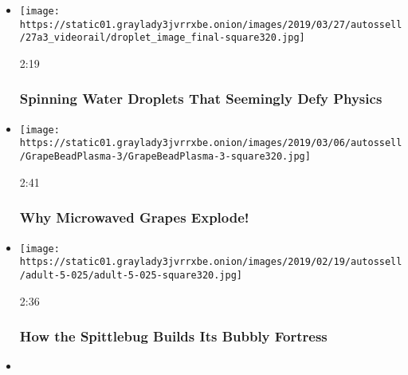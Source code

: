 \begin{itemize}
\item
  \href{https://www.nytimes3xbfgragh.onion/video/science/100000006415939/spinning-water-droplets-that-defy-physics.html?action=click\&module=video-series-bar\&region=header\&pgtype=Article\&playlistId=video/sciencetake}{}

  \texttt{[image: https://static01.graylady3jvrrxbe.onion/images/2019/03/27/autossell/27a3\_videorail/droplet\_image\_final-square320.jpg]}

  2:19

  \hypertarget{spinning-water-droplets-that-seemingly-defy-physics}{%
  \subsubsection{Spinning Water Droplets That Seemingly Defy
  Physics}\label{spinning-water-droplets-that-seemingly-defy-physics}}
\item
  \href{https://www.nytimes3xbfgragh.onion/video/science/100000006374883/why-microwaved-grapes-explode.html?action=click\&module=video-series-bar\&region=header\&pgtype=Article\&playlistId=video/sciencetake}{}

  \texttt{[image: https://static01.graylady3jvrrxbe.onion/images/2019/03/06/autossell/GrapeBeadPlasma-3/GrapeBeadPlasma-3-square320.jpg]}

  2:41

  \hypertarget{why-microwaved-grapes-explode}{%
  \subsubsection{Why Microwaved Grapes
  Explode!}\label{why-microwaved-grapes-explode}}
\item
  \href{https://www.nytimes3xbfgragh.onion/video/science/100000006346172/how-the-spittlebug-builds-its-bubbly-fortress.html?action=click\&module=video-series-bar\&region=header\&pgtype=Article\&playlistId=video/sciencetake}{}

  \texttt{[image: https://static01.graylady3jvrrxbe.onion/images/2019/02/19/autossell/adult-5-025/adult-5-025-square320.jpg]}

  2:36

  \hypertarget{how-the-spittlebug-builds-its-bubbly-fortress}{%
  \subsubsection{How the Spittlebug Builds Its Bubbly
  Fortress}\label{how-the-spittlebug-builds-its-bubbly-fortress}}
\item
  \href{https://www.nytimes3xbfgragh.onion/video/science/100000006321699/how-the-hummingbird-bill-evolved-for-battle.html?action=click\&module=video-series-bar\&region=header\&pgtype=Article\&playlistId=video/sciencetake}{}


\end{itemize}
